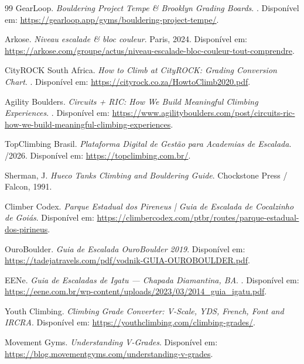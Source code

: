 \begin{thebibliography}{99}
GearLoop.
\newblock \textit{Bouldering Project Tempe \& Brooklyn Grading Boards}.
. Disponível em: \url{https://gearloop.app/gyms/bouldering-project-tempe/}.

Arkose.
\newblock \textit{Niveau escalade \& bloc couleur}.
\newblock Paris, 2024. Disponível em: \url{https://arkose.com/groupe/actus/niveau-escalade-bloc-couleur-tout-comprendre}.

CityROCK South Africa.
\newblock \textit{How to Climb at CityROCK: Grading Conversion Chart}.
. Disponível em: \url{https://cityrock.co.za/HowtoClimb2020.pdf}.

Agility Boulders.
\newblock \textit{Circuits + RIC: How We Build Meaningful Climbing Experiences}.
. Disponível em: \url{https://www.agilityboulders.com/post/circuits-ric-how-we-build-meaningful-climbing-experiences}.

TopClimbing Brasil.
\newblock \textit{Plataforma Digital de Gestão para Academias de Escalada}.
/2026. Disponível em: \url{https://topclimbing.com.br/}.

Sherman, J.
\newblock \textit{Hueco Tanks Climbing and Bouldering Guide}.
\newblock Chockstone Press / Falcon, 1991.

Climber Codex.
\newblock \textit{Parque Estadual dos Pireneus | Guia de Escalada de Cocalzinho de Goiás}.
\newblock Disponível em: \url{https://climbercodex.com/ptbr/routes/parque-estadual-dos-pirineus}.

OuroBoulder.
\newblock \textit{Guia de Escalada OuroBoulder 2019}.
\newblock Disponível em: \url{https://tadejatravels.com/pdf/vodnik-GUIA-OUROBOULDER.pdf}.

EENe.
\newblock \textit{Guia de Escaladas de Igatu --- Chapada Diamantina, BA}.
. Disponível em: \url{https://eene.com.br/wp-content/uploads/2023/03/2014_guia_igatu.pdf}.

Youth Climbing.
\newblock \textit{Climbing Grade Converter: V-Scale, YDS, French, Font and IRCRA}.
\newblock Disponível em: \url{https://youthclimbing.com/climbing-grades/}.

Movement Gyms.
\newblock \textit{Understanding V-Grades}.
\newblock Disponível em: \url{https://blog.movementgyms.com/understanding-v-grades}.


\end{thebibliography}
